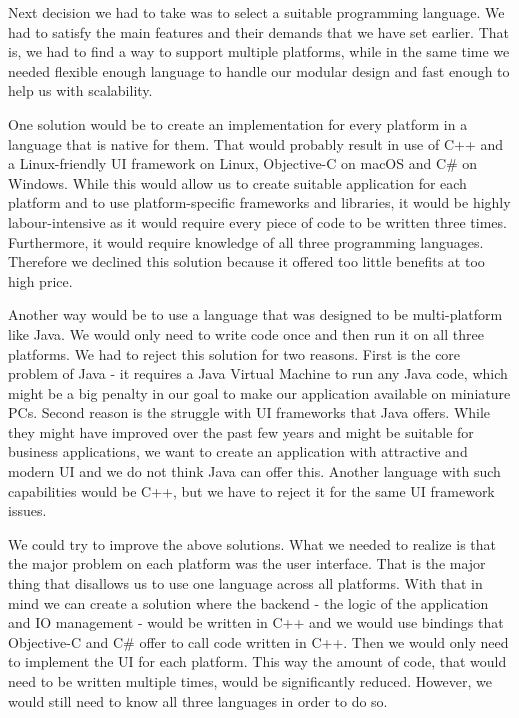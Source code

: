 Next decision we had to take was to select a suitable programming language. We had to satisfy the main features and their demands that we have set earlier. That is, we had to find a way to support multiple platforms, while in the same time we needed flexible enough language to handle our modular design and fast enough to help us with scalability.
\par
One solution would be to create an implementation for every platform in a language that is native for them. That would probably result in use of C++ and a Linux-friendly UI framework on Linux, Objective-C on macOS and C\# on Windows. While this would allow us to create suitable application for each platform and to use platform-specific frameworks and libraries, it would be highly labour-intensive as it would require every piece of code to be written three times. Furthermore, it would require knowledge of all three programming languages. Therefore we declined this solution because it offered too little benefits at too high price.
\par
Another way would be to use a language that was designed to be multi-platform like Java. We would only need to write code once and then run it on all three platforms. We had to reject this solution for two reasons. First is the core problem of Java - it requires a Java Virtual Machine to run any Java code, which might be a big penalty in our goal to make our application available on miniature PCs. Second reason is the struggle with UI frameworks that Java offers. While they might have improved over the past few years and might be suitable for business applications, we want to create an application with attractive and modern UI and we do not think Java can offer this. Another language with such capabilities would be C++, but we have to reject it for the same UI framework issues.  
\par
We could try to improve the above solutions. What we needed to realize is that the major problem on each platform was the user interface. That is the major thing that disallows us to use one language across all platforms. With that in mind we can create a solution where the backend - the logic of the application and IO management - would be written in C++ and we would use bindings that Objective-C and C\# offer to call code written in C++. Then we would only need to implement the UI for each platform. This way the amount of code, that would need to be written multiple times, would be significantly reduced. However, we would still need to know all three languages in order to do so.
